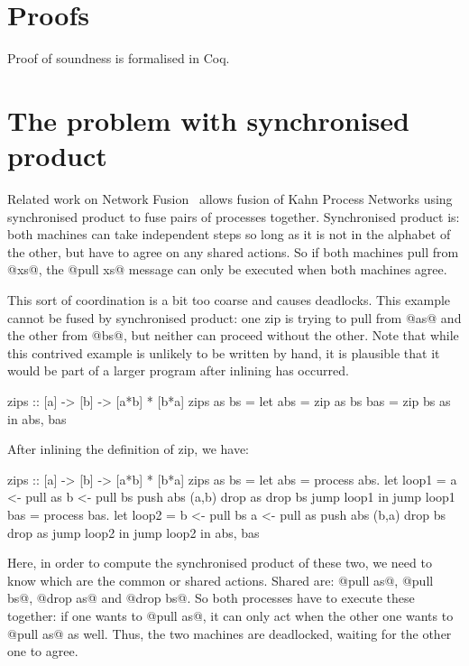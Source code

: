 \section{Proofs}
\label{s:Proofs}
Proof of soundness is formalised in Coq.


\section{The problem with synchronised product}
Related work on Network Fusion~\cite{fradet2004network} allows fusion of Kahn Process Networks using synchronised product to fuse pairs of processes together.
Synchronised product is: both machines can take independent steps so long as it is not in the alphabet of the other, but have to agree on any shared actions.
So if both machines pull from @xs@, the @pull xs@ message can only be executed when both machines agree.

This sort of coordination is a bit too coarse and causes deadlocks.
This example cannot be fused by synchronised product: one zip is trying to pull from @as@ and the other from @bs@, but neither can proceed without the other.
Note that while this contrived example is unlikely to be written by hand, it is plausible that it would be part of a larger program after inlining has occurred.

\begin{code}
zips :: [a] -> [b] -> [a*b] * [b*a]
zips as bs =
  let abs = zip as bs
      bas = zip bs as
  in  abs, bas
\end{code}

After inlining the definition of zip, we have:
\begin{code}
zips :: [a] -> [b] -> [a*b] * [b*a]
zips as bs =
  let abs = process abs.
       let loop1 =
          a <- pull as
          b <- pull bs
          push abs (a,b)
          drop as
          drop bs
          jump loop1
       in jump loop1
      bas = process bas.
       let loop2 =
          b <- pull bs
          a <- pull as
          push abs (b,a)
          drop bs
          drop as
          jump loop2
       in jump loop2
  in  abs, bas
\end{code}

Here, in order to compute the synchronised product of these two, we need to know which are the common or shared actions.
Shared are: @pull as@, @pull bs@, @drop as@ and @drop bs@.
So both processes have to execute these together: if one wants to @pull as@, it can only act when the other one wants to @pull as@ as well.
Thus, the two machines are deadlocked, waiting for the other one to agree.


